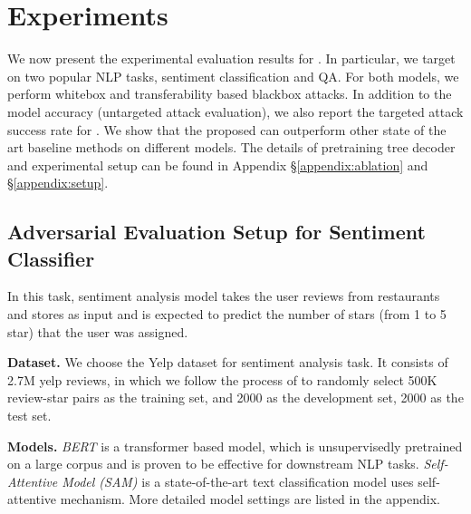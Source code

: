 \section{Experiments}
We now  present the experimental evaluation results for \advcodec. In particular, we target on two popular NLP tasks, sentiment classification and QA. For both models, we perform whitebox and transferability based blackbox attacks. In addition to the model accuracy (untargeted attack evaluation), we also report the targeted attack success rate for \advcodec. We show that the proposed \advcodec can outperform other state of the art baseline methods on different models. The details of pretraining tree decoder and experimental setup can be found in Appendix \S \ref{appendix:ablation} and \S \ref{appendix:setup}.





\subsection{Adversarial Evaluation Setup for Sentiment Classifier}
 In this task, sentiment analysis model takes the user reviews from restaurants and stores as input and is expected to predict the number of stars (from 1 to 5 star) that the user was assigned.
 
\textbf{Dataset.}
We choose the Yelp dataset \citep{yelpdataset} for sentiment analysis task. It consists of 2.7M yelp reviews, in which we follow the process of \citet{nfc512} to randomly select 500K review-star pairs as the training set, and 2000 as the development set, 2000 as the test set.  

\textbf{Models.}  \textit{{BERT}} \citep{Devlin2019BERTPO} is a transformer \citep{Vaswani2017AttentionIA} based model, which is unsupervisedly pretrained on a large corpus and is proven to be effective for downstream NLP tasks.  
 \textit {{Self-Attentive Model (SAM)}} \citep{nfc512} is a state-of-the-art text classification model uses self-attentive mechanism. More detailed model settings are listed in the appendix.
    
